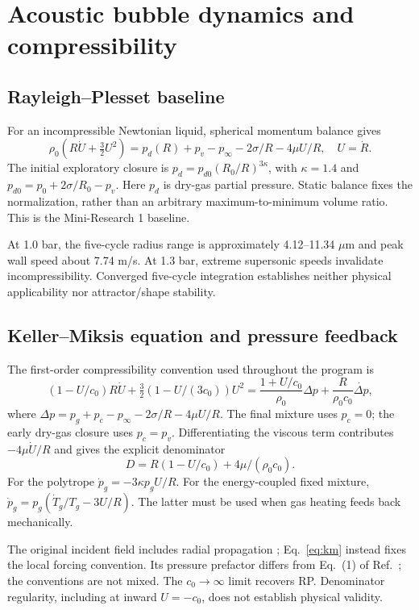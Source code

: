 \documentclass[11pt,a4paper]{article}
\begin{document}
\section{Acoustic bubble dynamics and compressibility}
\subsection{Rayleigh--Plesset baseline}
For an incompressible Newtonian liquid, spherical momentum balance gives
\begin{equation}
\rho_0(R\dot U+\tfrac32U^2)=p_d(R)+p_v-p_\infty-2\sigma/R-4\mu U/R,
\quad U=\dot R.
\end{equation}
The initial exploratory closure is $p_d=p_{d0}(R_0/R)^{3\kappa}$, with $\kappa=1.4$ and $p_{d0}=p_0+2\sigma/R_0-p_v$. Here $p_d$ is dry-gas partial pressure. Static balance fixes the normalization, rather than an arbitrary maximum-to-minimum volume ratio. This is the Mini-Research 1 baseline.

At 1.0 bar, the five-cycle radius range is approximately 4.12--11.34 $\mu$m and peak wall speed about 7.74 m/s. At 1.3 bar, extreme supersonic speeds invalidate incompressibility. Converged five-cycle integration establishes neither physical applicability nor attractor/shape stability.
\subsection{Keller--Miksis equation and pressure feedback}
The first-order compressibility convention used throughout the program is
\begin{equation}\label{eq:km}
(1-U/c_0)R\dot U+\tfrac32(1-U/(3c_0))U^2
=\frac{1+U/c_0}{\rho_0}\Delta p+\frac{R}{\rho_0c_0}\dot{\Delta p},
\end{equation}
where $\Delta p=p_g+p_c-p_\infty-2\sigma/R-4\mu U/R$. The final mixture uses $p_c=0$; the early dry-gas closure uses $p_c=p_v$. Differentiating the viscous term contributes $-4\mu\dot U/R$ and gives the explicit denominator
\begin{equation}
D=R(1-U/c_0)+4\mu/(\rho_0c_0).
\end{equation}
For the polytrope $\dot p_g=-3\kappa p_gU/R$. For the energy-coupled fixed mixture, $\dot p_g=p_g(\dot T_g/T_g-3U/R)$. The latter must be used when gas heating feeds back mechanically.

The original incident field includes radial propagation \cite{km}; Eq.~\eqref{eq:km} instead fixes the local forcing convention. Its pressure prefactor differs from Eq.~(1) of Ref.~\cite{sadighi}; the conventions are not mixed. The $c_0\to\infty$ limit recovers RP. Denominator regularity, including at inward $U=-c_0$, does not establish physical validity.
\clearpage
\end{document}
